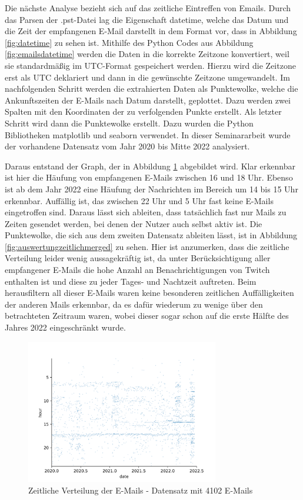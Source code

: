 \noindent Die nächste Analyse bezieht sich auf das zeitliche Eintreffen von Emails. Durch das Parsen der .pst-Datei lag die Eigenschaft \glqq{}datetime\grqq, welche das Datum und die Zeit der empfangenen E-Mail darstellt in dem Format vor, dass in Abbildung \ref{fig:datetime} zu sehen ist. Mithilfe des Python Codes aus Abbildung \ref{fig:emailsdatetime} werden die Daten in die korrekte Zeitzone konvertiert, weil sie standardmäßig im UTC-Format gespeichert werden. Hierzu wird die Zeitzone erst als UTC deklariert und dann in die gewünschte Zeitzone umgewandelt. Im nachfolgenden Schritt werden die extrahierten Daten als Punktewolke, welche die Ankunftszeiten der E-Mails nach Datum darstellt, geplottet. Dazu werden zwei Spalten mit den Koordinaten der zu verfolgenden Punkte erstellt. Als letzter Schritt wird dann die Punktewolke erstellt. Dazu wurden die Python Bibliotheken \glqq{}matplotlib\grqq{} und \glqq{}seaborn\grqq{} verwendet. In dieser Seminararbeit wurde der vorhandene Datensatz vom Jahr 2020 bis Mitte 2022 analysiert. \smallskip


\noindent Daraus entstand der Graph, der in Abbildung \ref{fig:auswertungzeitlich} abgebildet wird. Klar erkennbar ist hier die Häufung von empfangenen E-Mails zwischen 16 und 18 Uhr. Ebenso ist ab dem Jahr 2022 eine Häufung der Nachrichten im Bereich um 14 bis 15 Uhr erkennbar. Auffällig ist, das zwischen 22 Uhr und 5 Uhr fast keine E-Mails eingetroffen sind. Daraus lässt sich ableiten, dass tatsächlich fast nur Mails zu Zeiten gesendet werden, bei denen der Nutzer auch selbst aktiv ist. Die Punktewolke, die sich aus dem zweiten Datensatz ableiten lässt, ist in Abbildung \ref{fig:auswertungzeitlichmerged} zu sehen. Hier ist anzumerken, dass die zeitliche Verteilung leider wenig aussagekräftig ist, da unter Berücksichtigung aller empfangener E-Mails die hohe Anzahl an Benachrichtigungen von \glqq{}Twitch\grqq{} enthalten ist und diese zu jeder Tages- und Nachtzeit auftreten. Beim herausfiltern all dieser E-Mails waren keine besonderen zeitlichen Auffälligkeiten der anderen Mails erkennbar, da es dafür wiederum zu wenige über den betrachteten Zeitraum waren, wobei dieser sogar schon auf die erste Hälfte des Jahres 2022 eingeschränkt wurde. \smallskip

\begin{figure}[!ht]
    \centering
    \includegraphics[width=0.75\textwidth]{images/plot.PNG}
    \caption{Zeitliche Verteilung der E-Mails - Datensatz mit 4102 E-Mails} 
    \label{fig:auswertungzeitlich}
\end{figure}

